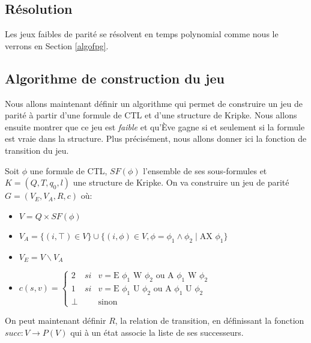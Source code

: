 \documentclass[10pt,a4paper]{article}
\begin{document}
\subsection{Résolution}
Les jeux faibles de parité se résolvent en temps polynomial comme nous le verrons en Section \ref{algofpg}.

\subsection{Algorithme de construction du jeu}
Nous allons maintenant définir un algorithme qui permet de construire un jeu de parité à partir d'une formule de CTL et d'une structure de Kripke. Nous allons ensuite montrer que ce jeu est \emph{faible} et qu'Ève gagne si et seulement si la formule est vraie dans la structure. Plus précisément, nous allons donner ici la fonction de transition du jeu.

Soit $\phi$ une formule de CTL, $SF(\phi)$ l'ensemble de ses sous-formules et $K = (Q,T,q_0,l)$  une structure de Kripke.
On va construire un jeu de parité $G = (V_E,V_A,R,c)$ où:
\begin{itemize}
	\item $V = Q \times SF(\phi)$
	\item $V_A = \{(i, \top ) \in V\} \cup \{(i, \phi) \in V, \phi = \phi_1 \land \phi_2 \mid \mbox{AX } \phi_1 \}$
	\item $V_E = V \backslash V_A$
	\item $c(s,v) = \left \{
	\begin{array}{rcl}
		2 & si & v = \mbox{E } \phi_1 \mbox{ W } \phi_2\text{ ou }\mbox{A } \phi_1 \mbox{ W } \phi_2\\
		1 & si & v = \mbox{E } \phi_1 \mbox{ U } \phi_2\text{ ou }\mbox{A } \phi_1 \mbox{ U } \phi_2\\
		\bot && \text{sinon}
	\end{array}
	\right .$
\end{itemize}

\bigskip

On peut maintenant définir $R$, la relation de transition, en définissant la fonction $succ : V \to P(V)$ qui à un état associe la liste de ses successeurs.\\
\end{document}
